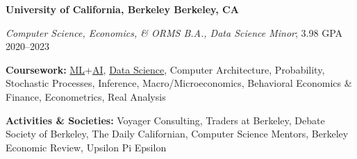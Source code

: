 \textbf{University of California, Berkeley \hfill Berkeley, CA} \par
\textit{Computer Science, Economics, \& ORMS B.A., Data Science Minor}; 3.98 GPA \hfill 2020--2023\par
\textbf{Coursework:} \href{https://www.eecs189.org/}{ML}+\href{https://inst.eecs.berkeley.edu/~cs188/fa22/}{AI}, \href{https://ds100.org/}{Data Science},  Computer Architecture, Probability, Stochastic Processes, Inference, Macro/Microeconomics, Behavioral Economics
\& Finance, Econometrics, Real Analysis \par
\textbf{Activities \& Societies:} Voyager Consulting, Traders at Berkeley, Debate Society of Berkeley, The Daily Californian, Computer Science Mentors, Berkeley Economic Review, Upsilon Pi Epsilon